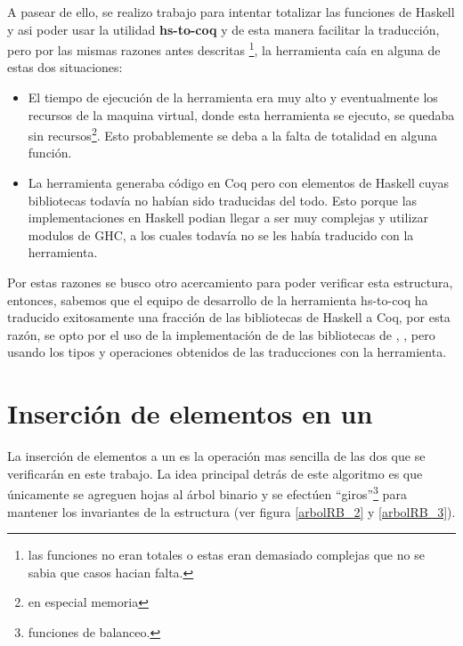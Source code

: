 A pasear de ello, se realizo trabajo para intentar totalizar las funciones de Haskell y asi poder 
usar la utilidad \textbf{hs-to-coq} y de esta manera facilitar la traducci\'on, pero por las mismas
razones antes descritas \footnote{las funciones no eran totales o estas eran demasiado complejas
que no se sabia que casos hacian falta.}, la herramienta caía en alguna de estas dos situaciones:

\begin{itemize}
    \item El tiempo de ejecuci\'on de la herramienta era muy alto y eventualmente los recursos de
    la maquina virtual, donde esta herramienta se ejecuto, se quedaba sin recursos\footnote{en
    especial memoria}. Esto probablemente se deba a la falta de totalidad en alguna función.
    \item La herramienta generaba c\'odigo en Coq pero con elementos de Haskell cuyas bibliotecas
    todavía no habían sido traducidas del todo. Esto porque las implementaciones en Haskell podian
    llegar a ser muy complejas y utilizar modulos de GHC, a los cuales todav\'ia no se les hab\'ia
    traducido con la herramienta.
\end{itemize}{}

Por estas razones se busco otro acercamiento para poder verificar esta estructura, entonces,
sabemos que el equipo de desarrollo de la herramienta hs-to-coq ha traducido exitosamente una
fracci\'on de las bibliotecas de Haskell a Coq, por esta raz\'on, se opto por el uso de la
implementación de {\arns} de las bibliotecas de {\coq}, \cite{MSetRBT}, pero usando los tipos y
operaciones obtenidos de las traducciones con la herramienta.

\section{Inserción de elementos en un {\arn}}

La inserci\'on de elementos a un {\arn} es la operaci\'on mas sencilla de las dos que se
verificar\'an en este trabajo. La idea principal detrás de este algoritmo es que \'unicamente se 
agreguen hojas al \'arbol binario y se efectúen ``giros''\footnote{funciones de balanceo.} para 
mantener los invariantes de la estructura (ver figura \ref{arbolRB_2} y \ref{arbolRB_3}).

